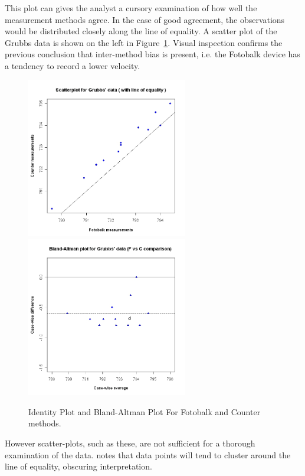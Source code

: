 \documentclass[12pt, a4paper]{report}
\theoremstyle{plain}
\theoremstyle{definition}
\theoremstyle{remark}
\begin{document}
This plot can gives the analyst a cursory examination of how well the measurement methods agree. In the case of good agreement, the observations would be distributed closely along the line of equality.  A scatter plot of the Grubbs data is shown on the left in Figure~\ref{GrubbsBAcombined}. Visual inspection confirms the previous conclusion that inter-method bias is present, i.e. the Fotobalk device has a tendency to record a lower velocity.
	
	\begin{figure}[h!]
		\begin{center}
			\includegraphics[width=70mm]{images/GrubbsScatter.jpeg}				\includegraphics[width=70mm]{images/GrubbsBAplot-noLOA.jpeg}\\
				\caption{Identity Plot and Bland-Altman Plot For Fotobalk and Counter methods.}\label{GrubbsBAcombined}
			\end{center}
		\end{figure}
However scatter-plots, such as these, are not sufficient for a thorough examination of the data. \citet{BritHypSoc} notes that data points will tend to cluster around the line of equality, obscuring interpretation.
	
\end{document}

